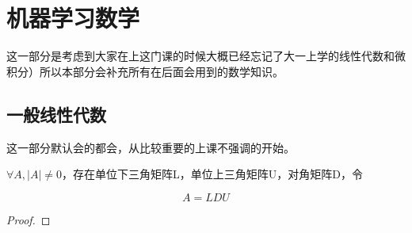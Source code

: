 \section{机器学习数学}

这一部分是考虑到大家在上这门课的时候大概已经忘记了大一上学的线性代数和微积分）所以本部分会补充所有在后面会用到的数学知识。

\subsection{一般线性代数}

这一部分默认会的都会，从比较重要的上课不强调的开始。

\begin{theorem}[LDU分解]

    $\forall A , |A| \neq 0 $，存在单位下三角矩阵L，单位上三角矩阵U，对角矩阵D，令
    
    \[
        A = LDU
    \]
\end{theorem}

\begin{proof}
    
\end{proof}
